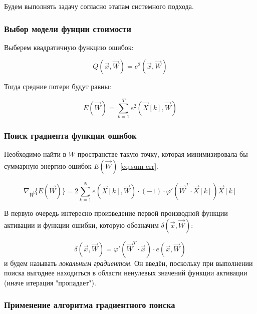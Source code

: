 \documentclass{article}
\numberwithin{equation}{subsection}
\begin{document}
Будем выполнять задачу согласно этапам системного подхода.



\subsubsection{Выбор модели фунции стоимости}

Выберем квадратичную функцию ошибок:

\begin{equation}
    Q(\vec{x}, \vec{W}) = e^2(\vec{x}, \vec{W})
\end{equation}

Тогда средние потери будут равны:
    
\begin{equation}
    E(\vec{W}) = \sum_{k=1}^{T} e^2 (\vec{X}[k], \vec{W})
    \label{eq:sum-err}
\end{equation}



\subsubsection{Поиск градиента функции ошибок}

Необходимо найти в $W$-пространстве такую точку, которая минимизировала бы суммарную 
энергию ошибок $E(\vec{W})$ \ref{eq:sum-err}.

\begin{equation}
    \nabla_{\vec{W}} \{ E(\vec{W}) \} = 2 \sum_{k=1}^{N} e (\vec{X}[k], \vec{W}) \cdot (-1)
    \cdot \varphi ' (\vec{W}^T \cdot \vec{X}[k]) \vec{X}[k]
\end{equation}

В первую очередь интересно произведение первой производной функции активации и функции ошибки, 
которую обозначим $\delta(\vec{x}, \vec{W})$:

\begin{equation}
    \delta(\vec{x}, \vec{W}) = \varphi ' (\vec{W}^{T} \cdot \vec{x}) \cdot e(\vec{x}, \vec{W})
\end{equation}
\noindent
и будем называть \textit{локальным градиентом}. 
Он введён, поскольку при выполнении поиска выгоднее находиться в области ненулевых значений
функции активации (иначе итерация "пропадает").



\subsubsection{Применение алгоритма градиентного поиска}
\end{document}
